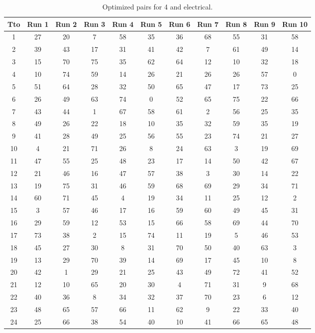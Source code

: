 \begin{table}
  \centering
  \scriptsize
  \caption{Optimized pairs for 4 and electrical.}
  \label{tab_pairs}
\begin{tabular}{c c c c c c c c c c c }
\hline
Tto & Run 1 & Run 2 & Run 3 & Run 4 & Run 5 & Run 6 & Run 7 & Run 8 & Run 9 & Run 10 \\
\hline
1 & 27 & 20 & 7 & 58 & 35 & 36 & 68 & 55 & 31 & 58 \\
2 & 39 & 43 & 17 & 31 & 41 & 42 & 7 & 61 & 49 & 14 \\
3 & 15 & 70 & 75 & 35 & 62 & 64 & 12 & 10 & 32 & 18 \\
4 & 10 & 74 & 59 & 14 & 26 & 21 & 26 & 26 & 57 & 0 \\
5 & 51 & 64 & 28 & 32 & 50 & 65 & 47 & 17 & 73 & 25 \\
6 & 26 & 49 & 63 & 74 & 0 & 52 & 65 & 75 & 22 & 66 \\
7 & 43 & 44 & 1 & 67 & 58 & 61 & 2 & 56 & 25 & 35 \\
8 & 49 & 26 & 22 & 18 & 10 & 35 & 32 & 59 & 35 & 19 \\
9 & 41 & 28 & 49 & 25 & 56 & 55 & 23 & 74 & 21 & 27 \\
10 & 4 & 21 & 71 & 26 & 8 & 24 & 63 & 3 & 19 & 69 \\
11 & 47 & 55 & 25 & 48 & 23 & 17 & 14 & 50 & 42 & 67 \\
12 & 21 & 46 & 16 & 47 & 57 & 38 & 3 & 30 & 14 & 22 \\
13 & 19 & 75 & 31 & 46 & 59 & 68 & 69 & 29 & 34 & 71 \\
14 & 60 & 71 & 45 & 4 & 19 & 34 & 11 & 25 & 12 & 2 \\
15 & 3 & 57 & 46 & 17 & 16 & 59 & 60 & 49 & 45 & 31 \\
16 & 29 & 59 & 12 & 53 & 15 & 66 & 58 & 69 & 44 & 70 \\
17 & 73 & 38 & 2 & 15 & 74 & 11 & 19 & 5 & 46 & 53 \\
18 & 45 & 27 & 30 & 8 & 31 & 70 & 50 & 40 & 63 & 3 \\
19 & 13 & 29 & 70 & 39 & 14 & 69 & 17 & 45 & 10 & 8 \\
20 & 42 & 1 & 29 & 21 & 25 & 43 & 49 & 72 & 41 & 52 \\
21 & 12 & 10 & 65 & 20 & 30 & 4 & 71 & 31 & 9 & 68 \\
22 & 40 & 36 & 8 & 34 & 32 & 37 & 70 & 23 & 6 & 12 \\
23 & 48 & 65 & 57 & 66 & 11 & 62 & 9 & 22 & 33 & 40 \\
24 & 25 & 66 & 38 & 54 & 40 & 10 & 41 & 66 & 65 & 48 \\

\end{tabular}
\end{table}
